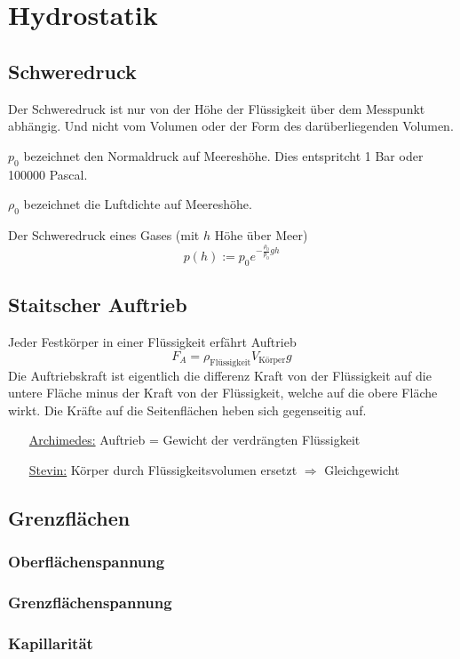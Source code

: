 \section{Hydrostatik}

\subsection{Schweredruck}
Der Schweredruck ist nur von der Höhe der Flüssigkeit über dem Messpunkt abhängig.
Und nicht vom Volumen oder der Form des darüberliegenden Volumen.

$p_0$ bezeichnet den Normaldruck auf Meereshöhe. Dies entspritcht 1 Bar oder 100000 Pascal.

$\rho_0$ bezeichnet die Luftdichte auf Meereshöhe.

Der Schweredruck eines Gases (mit $h$ Höhe über Meer) 
\[
    p(h) := p_0 e^{-\frac{\rho_0}{p_0}gh}
\]

\subsection{Staitscher Auftrieb}
Jeder Festkörper in einer Flüssigkeit erfährt Auftrieb
\[
    F_A=\rho_\text{Flüssigkeit}V_\text{Körper}g
\]
Die Auftriebskraft ist eigentlich die differenz Kraft von der Flüssigkeit auf die untere
Fläche minus der Kraft von der Flüssigkeit, welche auf die obere Fläche wirkt.
Die Kräfte auf die Seitenflächen heben sich gegenseitig auf.
\begin{itemize}
\item[\underline{Archimedes:}] Auftrieb = Gewicht der verdrängten Flüssigkeit
\item[\underline{Stevin:}] Körper durch Flüssigkeitsvolumen ersetzt $\Rightarrow$ Gleichgewicht
\end{itemize}



\subsection{Grenzflächen}

\subsubsection{Oberflächenspannung}

\subsubsection{Grenzflächenspannung}

\subsubsection{Kapillarität}
